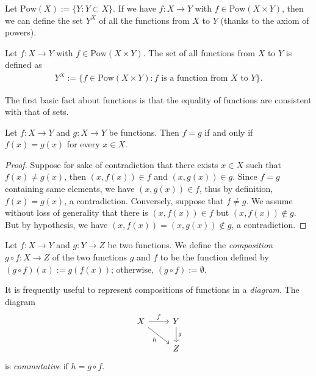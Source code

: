 Let $\mathrm{Pow}(X) := \{Y : Y \subset X\}$. If we have $f : X \to Y$ with $f \in \mathrm{Pow}(X \times Y)$, then we can define the set $Y^X$ of all the functions from $X$ to $Y$ (thanks to the axiom of powers).

\begin{definition}
    Let $f : X \to Y$ with $f \in \mathrm{Pow}(X \times Y)$. The set of all functions from $X$ to $Y$ is defined as
    \begin{align*}
        Y^X := \{f \in \mathrm{Pow}(X \times Y) : f \text{ is a function from } X \text{ to } Y\}.
    \end{align*}
\end{definition}

The first basic fact about functions is that the equality of functions are consistent with that of sets.

\begin{lemma}
    Let $f : X \to Y$ and $g : X \to Y$ be functions. Then $f = g$ if and only if $f(x) = g(x)$ for every $x \in X$.
\end{lemma}

\begin{proof}
    Suppose for sake of contradiction that there exists $x \in X$ such that $f(x) \neq g(x)$, then $(x, f(x)) \in f$ and $(x, g(x)) \in g$. Since $f = g$ containing same elements, we have $(x, g(x)) \in f$, thus by definition, $f(x) = g(x)$, a contradiction. Conversely, suppose that $f \neq g$. We assume without loss of generality that there is $(x, f(x)) \in f$ but $(x, f(x)) \notin g$. But by hypothesis, we have $(x, f(x)) = (x, g(x)) \notin g$, a contradiction.
\end{proof}

\begin{definition}[Composition]
    Let $f : X \to Y$ and $g : Y \to Z$ be two functions. We define the \emph{composition} $g \circ f : X \to Z$ of the two functions $g$ and $f$ to be the function defined by $(g \circ f)(x) := g(f(x))$; otherwise, $(g \circ f) := \emptyset$.
\end{definition}

\begin{remark}
    It is frequently useful to represent compositions of functions in a \emph{diagram}. The diagram
    \[
    \begin{tikzcd}
        X \arrow[r, "f"] \arrow[dr, swap, "h"] & Y \arrow[d, "g"]\\
        & Z
    \end{tikzcd}
    \]
    is \emph{commutative} if $h = g \circ f$.
\end{remark}

